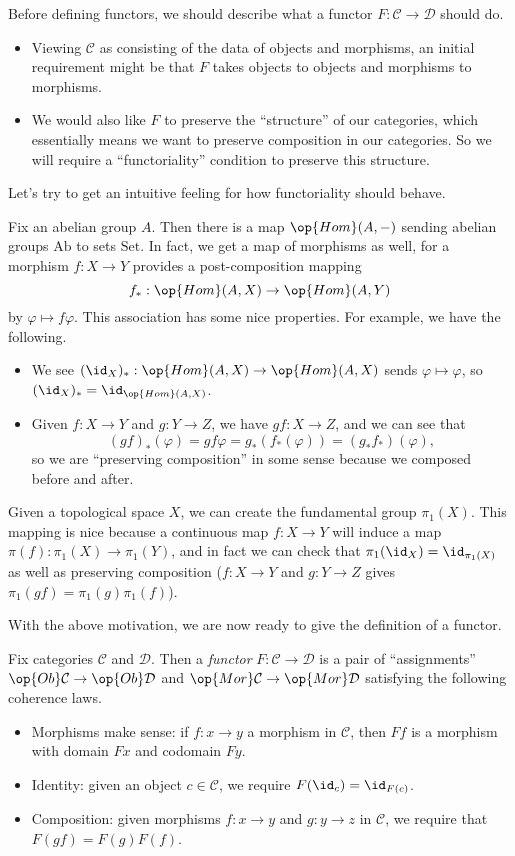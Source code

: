 Before defining functors, we should describe what a functor $F:\mathcal C\to\mathcal D$ should do.
\begin{itemize}
	\item Viewing $\mathcal C$ as consisting of the data of objects and morphisms, an initial requirement might be that $F$ takes objects to objects and morphisms to morphisms.
	\item We would also like $F$ to preserve the ``structure'' of our categories, which essentially means we want to preserve composition in our categories. So we will require a ``functoriality'' condition to preserve this structure.
\end{itemize}
Let's try to get an intuitive feeling for how functoriality should behave.
\begin{example}
	Fix an abelian group $A$. Then there is a map $\op{Hom}(A,-)$ sending abelian groups $\mathrm{Ab}$ to sets $\mathrm{Set}$. In fact, we get a map of morphisms as well, for a morphism $f:X\to Y$ provides a post-composition mapping
	\[f_*:\op{Hom}(A,X)\to\op{Hom}(A,Y)\]
	by $\varphi\mapsto f\varphi$. This association has some nice properties. For example, we have the following.
	\begin{itemize}
		\item We see $(\id_X)_*:\op{Hom}(A,X)\to\op{Hom}(A,X)$ sends $\varphi\mapsto\varphi$, so $(\id_X)_*=\id_{\op{Hom}(A,X)}$.
		\item Given $f:X\to Y$ and $g:Y\to Z$, we have $gf:X\to Z$, and we can see that
		\[(gf)_*(\varphi)=gf\varphi=g_*(f_*(\varphi))=(g_*f_*)(\varphi),\]
		so we are ``preserving composition'' in some sense because we composed before and after.
	\end{itemize}
\end{example}
\begin{example}
	Given a topological space $X$, we can create the fundamental group $\pi_1(X)$. This mapping is nice because a continuous map $f:X\to Y$ will induce a map $\pi(f):\pi_1(X)\to\pi_1(Y)$, and in fact we can check that $\pi_1(\id_X)=\id_{\pi_1(X)}$ as well as preserving composition ($f:X\to Y$ and $g:Y\to Z$ gives $\pi_1(gf)=\pi_1(g)\pi_1(f)$).
\end{example}

With the above motivation, we are now ready to give the definition of a functor.
\begin{definition}[Functor]
	Fix categories $\mathcal C$ and $\mathcal D$. Then a \textit{functor} $F:\mathcal C\to\mathcal D$ is a pair of ``assignments'' $\op{Ob}\mathcal C\to\op{Ob}\mathcal D$ and $\op{Mor}\mathcal C\to\op{Mor}\mathcal D$ satisfying the following coherence laws.
	\begin{itemize}
		\item Morphisms make sense: if $f:x\to y$ a morphism in $\mathcal C$, then $Ff$ is a morphism with domain $Fx$ and codomain $Fy$.
		\item Identity: given an object $c\in\mathcal C$, we require $F(\id_c)=\id_{F(c)}$.
		\item Composition: given morphisms $f:x\to y$ and $g:y\to z$ in $\mathcal C$, we require that $F(gf)=F(g)F(f)$.
	\end{itemize}
\end{definition}

